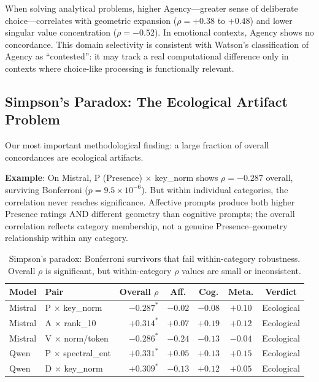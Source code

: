 \documentclass[11pt,a4paper]{article}
\begin{document}
When solving analytical problems, higher Agency---greater sense of deliberate choice---correlates with geometric expansion ($\rho = +0.38$ to $+0.48$) and lower singular value concentration ($\rho = -0.52$). In emotional contexts, Agency shows no concordance. This domain selectivity is consistent with Watson's classification of Agency as ``contested'': it may track a real computational difference only in contexts where choice-like processing is functionally relevant.

\subsection{Simpson's Paradox: The Ecological Artifact Problem}
\label{sec:simpson}

Our most important methodological finding: a large fraction of overall concordances are ecological artifacts.

\textbf{Example}: On Mistral, P (Presence) $\times$ key\_norm shows $\rho = -0.287$ overall, surviving Bonferroni ($p = 9.5 \times 10^{-6}$). But within individual categories, the correlation never reaches significance. Affective prompts produce both higher Presence ratings AND different geometry than cognitive prompts; the overall correlation reflects category membership, not a genuine Presence--geometry relationship within any category.

\begin{table}[H]
\centering
\caption{Simpson's paradox: Bonferroni survivors that fail within-category robustness. Overall $\rho$ is significant, but within-category $\rho$ values are small or inconsistent.}
\label{tab:simpson}
\begin{tabular}{llrcccc}
\toprule
\textbf{Model} & \textbf{Pair} & \textbf{Overall $\rho$} & \textbf{Aff.} & \textbf{Cog.} & \textbf{Meta.} & \textbf{Verdict} \\
\midrule
Mistral & P $\times$ key\_norm     & $-0.287^*$ & $-0.02$ & $-0.08$ & $+0.10$ & Ecological \\
Mistral & A $\times$ rank\_10      & $+0.314^*$ & $+0.07$ & $+0.19$ & $+0.12$ & Ecological \\
Mistral & V $\times$ norm/token    & $-0.286^*$ & $-0.24$ & $-0.13$ & $-0.04$ & Ecological \\
Qwen    & P $\times$ spectral\_ent & $+0.331^*$ & $+0.05$ & $+0.13$ & $+0.15$ & Ecological \\
Qwen    & D $\times$ key\_norm     & $+0.309^*$ & $-0.13$ & $+0.12$ & $+0.05$ & Ecological \\
\bottomrule
\end{tabular}
\end{table}
\end{document}

